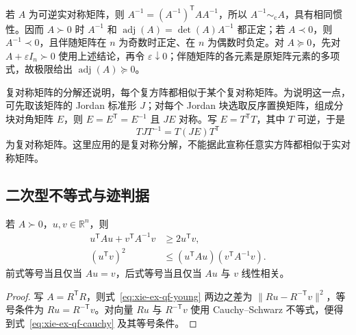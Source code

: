 若 $A$ 为可逆实对称矩阵，则 $A^{-1}= (A^{-1})^{\mathsf T}A A^{-1}$，所以 $A^{-1}\sim_{\mathrm c}A$，具有相同惯性。因而 $A\succ0$ 时 $A^{-1}$ 和 $\operatorname{adj}(A)=\det(A)A^{-1}$ 都正定；若 $A\prec0$，则 $A^{-1}\prec0$，且伴随矩阵在 $n$ 为奇数时正定、在 $n$ 为偶数时负定。对 $A\succeq0$，先对 $A+\varepsilon I_n\succ0$ 使用上述结论，再令 $\varepsilon\downarrow0$；伴随矩阵的各元素是原矩阵元素的多项式，故极限给出 $\operatorname{adj}(A)\succeq0$。

复对称矩阵的分解还说明，每个复方阵都相似于某个复对称矩阵。为说明这一点，可先取该矩阵的 Jordan 标准形 $J$；对每个 Jordan 块选取反序置换矩阵，组成分块对角矩阵 $E$，则 $E=E^{\mathsf T}=E^{-1}$ 且 $JE$ 对称。写 $E=T^{\mathsf T}T$，其中 $T$ 可逆，于是
\[
 TJT^{-1}=T(JE)T^{\mathsf T}
\]
为复对称矩阵。这里应用的是复对称分解，不能据此宣称任意实方阵都相似于实对称矩阵。

\subsection{二次型不等式与迹判据}

\begin{proposition}
\label{prop:xie-ex-qf-weighted-inequalities}
若 $A\succ0$，$u,v\in\mathbb R^n$，则
\begin{align}
 u^{\mathsf T}Au+v^{\mathsf T}A^{-1}v&\ge2u^{\mathsf T}v,
 \label{eq:xie-ex-qf-young}\\
 (u^{\mathsf T}v)^2&\le(u^{\mathsf T}Au)(v^{\mathsf T}A^{-1}v).
 \label{eq:xie-ex-qf-cauchy}
\end{align}
前式等号当且仅当 $Au=v$，后式等号当且仅当 $Au$ 与 $v$ 线性相关。
\end{proposition}
\begin{proof}
写 $A=R^{\mathsf T}R$，则式~\eqref{eq:xie-ex-qf-young} 两边之差为 $\|Ru-R^{-\mathsf T}v\|^2$，等号条件为 $Ru=R^{-\mathsf T}v$。对向量 $Ru$ 与 $R^{-\mathsf T}v$ 使用 Cauchy--Schwarz 不等式，便得到式~\eqref{eq:xie-ex-qf-cauchy} 及其等号条件。
\end{proof}

